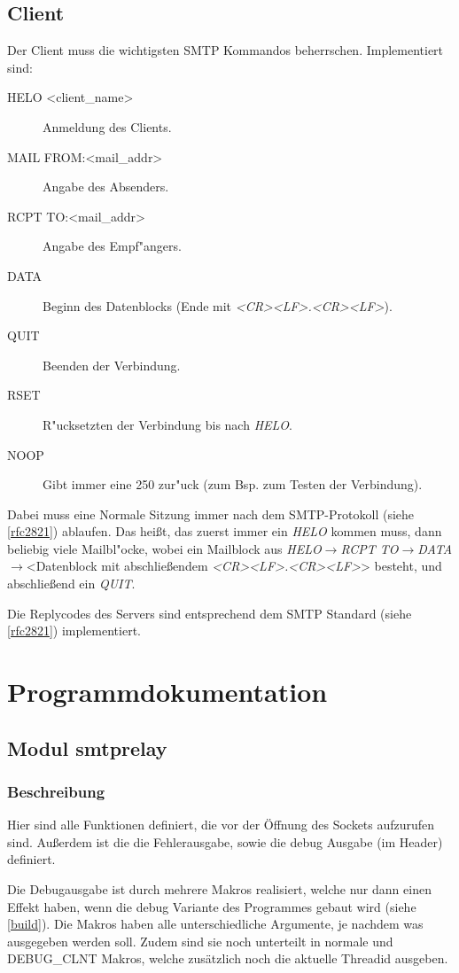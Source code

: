 \documentclass[pdftex,final,a4paper,10pt,notitlepage,halfparskip]{scrreprt}
\begin{document}
\section{Client}
Der Client muss die wichtigsten SMTP Kommandos beherrschen. Implementiert sind:
\begin{description}
  \item[HELO <client\_name>] Anmeldung des Clients.
  \item[MAIL FROM:<mail\_addr>] Angabe des Absenders.
  \item[RCPT TO:<mail\_addr>] Angabe des Empf"{a}ngers.
  \item[DATA] Beginn des Datenblocks (Ende mit \textit{<CR><LF>.<CR><LF>}).
  \item[QUIT] Beenden der Verbindung.
  \item[RSET] R"{u}cksetzten der Verbindung bis nach \textit{HELO}. 
  \item[NOOP] Gibt immer eine 250 zur"{u}ck (zum Bsp. zum Testen der Verbindung).
\end{description}

Dabei muss eine Normale Sitzung immer nach dem SMTP-Protokoll (siehe \ref{rfc2821}) ablaufen. Das heißt, das zuerst immer ein \textit{HELO} kommen muss, dann beliebig viele Mailbl"{o}cke, wobei ein Mailblock aus \textit{HELO}$\rightarrow$\textit{RCPT TO}$\rightarrow$\textit{DATA}$\rightarrow$<Datenblock mit abschließendem \textit{<CR><LF>.<CR><LF>}> besteht, und abschließend ein \textit{QUIT}.

Die Replycodes des Servers sind entsprechend dem SMTP Standard (siehe \ref{rfc2821}) implementiert.

\chapter{Programmdokumentation}
\section{Modul smtprelay}\label{mod:smtprelay}
\subsection{Beschreibung}
Hier sind alle Funktionen definiert, die vor der Öffnung des Sockets aufzurufen sind. Außerdem ist die die Fehlerausgabe, sowie die debug Ausgabe (im Header) definiert. 

Die Debugausgabe ist durch mehrere Makros realisiert, welche nur dann einen Effekt haben, wenn die debug Variante des Programmes gebaut wird (siehe \ref{build}). Die Makros haben alle unterschiedliche Argumente, je nachdem was ausgegeben werden soll. Zudem sind sie noch unterteilt in normale und DEBUG\_CLNT Makros, welche zusätzlich noch die aktuelle Threadid ausgeben.
\end{document}
